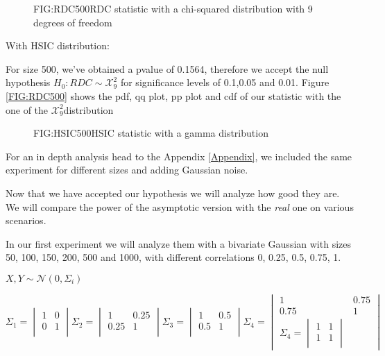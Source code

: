 \begin{figure}[RDC Asymptotic distribution]{FIG:RDC500}{RDC statistic with a chi-squared distribution with 9 degrees of freedom}
\end{figure}

With HSIC distribution:

For size 500, we've obtained a pvalue of 0.1564, therefore we accept the null hypothesis $H_{0}: RDC\sim \mathcal{X}^{2}_{9}$ for significance levels of 0.1,0.05 and 0.01. Figure \ref{FIG:RDC500} shows the pdf, qq plot, pp plot and cdf of our statistic with the one of the $\mathcal{X}^{2}_{9}$distribution
\begin{figure}[HSIC Asymptotic distribution]{FIG:HSIC500}{HSIC statistic with a gamma distribution}
\end{figure}

For an in depth analysis head to the Appendix \ref{Appendix}, we included the same experiment for different sizes and adding Gaussian noise.

Now that we have accepted our hypothesis we will analyze how good they are. We will compare the power of the asymptotic version with the \textit{real} one on various scenarios.

In our first experiment we will analyze them with a bivariate Gaussian with sizes 50, 100, 150, 200, 500 and 1000, with different correlations 0, 0.25, 0.5, 0.75, 1.

$ X,Y \sim \mathcal{N}(0,\Sigma_{i}) $


$$\Sigma_{1} =\begin{vmatrix}1&0\\0&1\\ \end{vmatrix} \Sigma_{2} =\begin{vmatrix}1&0.25\\0.25&1\\ \end{vmatrix} \Sigma_{3} =\begin{vmatrix}1&0.5\\0.5&1\\ \end{vmatrix} \Sigma_{4} =\begin{vmatrix}1&0.75\\0.75&1\\ \Sigma_{4} =\begin{vmatrix}1&1\\1&1\\ \end{vmatrix} \end{vmatrix}$$

